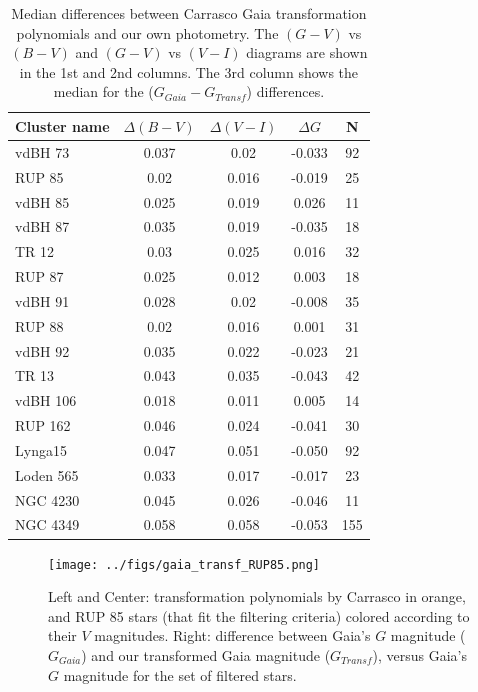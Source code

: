 \documentclass[draft]{aa}
\begin{document}
\begin{table}[ht]
    \centering
    \begin{tabular}{lcccc}
    \hline
    Cluster name & $\Delta (B-V)$ & $\Delta (V-I)$& $\Delta G$ & N \\
    \hline \hline
    vdBH 73 & 0.037 & 0.02 & -0.033 & 92 \\
    RUP 85 & 0.02 & 0.016 & -0.019 & 25\\
    vdBH 85 & 0.025 & 0.019 & 0.026 & 11\\
    vdBH 87 & 0.035 & 0.019 & -0.035 & 18\\
    TR 12 & 0.03 & 0.025 & 0.016 & 32\\
    RUP 87 & 0.025 & 0.012 & 0.003 & 18\\
    vdBH 91 & 0.028 & 0.02 & -0.008 & 35\\
    RUP 88 & 0.02 & 0.016 & 0.001 & 31\\
    vdBH 92 & 0.035 & 0.022 & -0.023 & 21\\
    TR 13 & 0.043 & 0.035 & -0.043 & 42\\
    vdBH 106 & 0.018 & 0.011 & 0.005 & 14\\
    RUP 162 & 0.046 & 0.024 & -0.041 & 30\\
    Lynga15 & 0.047 & 0.051 & -0.050 & 92\\
    Loden 565 & 0.033 & 0.017 & -0.017 & 23\\
    NGC 4230 & 0.045 & 0.026 & -0.046 & 11\\
    NGC 4349 & 0.058 & 0.058 & -0.053 & 155\\
    \hline
    \end{tabular}
    \caption{Median differences between Carrasco Gaia transformation
polynomials and our own photometry. The $(G-V)$ vs $(B-V)$ and $(G-V)$ vs
$(V-I)$ diagrams are shown in the 1st and 2nd columns. The 3rd column
shows the median for the ($G_{Gaia}-G_{Transf}$) differences.}
    \label{tab:gaia_diffs}
\end{table}

\begin{figure}[ht]
    \centering
     \texttt{[image: ../figs/gaia\_transf\_RUP85.png]}   
     \caption{Left and Center: transformation polynomials by Carrasco in
orange, and RUP 85 stars (that fit the filtering criteria) colored according to
their $V$ magnitudes. Right: difference between Gaia's $G$ magnitude
($G_{Gaia}$) and our transformed Gaia magnitude ($G_{Transf}$), versus
Gaia's $G$ magnitude for the set of filtered stars.}
    \label{fig:gaia_transf}
\end{figure}
\end{document}
